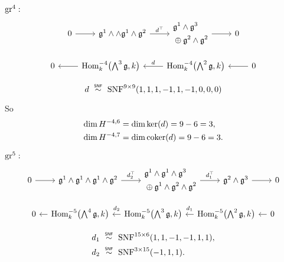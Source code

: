 $\operatorname{gr}^{4}:$
\[
  \begin{tikzcd}[ampersand replacement=\&]
    0 \ar[r] \& \lie{g}^{1} \wedge \wedge \lie{g}^{1} \wedge \lie{g}^{2} \ar[r,"d^{\top}"] \& \begin{aligned} &\lie{g}^{1} \wedge \lie{g}^{3} \\ &\oplus \lie{g}^{2} \wedge \lie{g}^{2} \end{aligned} \ar[r] \& 0
  \end{tikzcd}
\]

\[
  \begin{tikzcd}
    0 & \ar[l] \Hom_{k}^{-4}\bigl( \bigwedge^{3}\lie{g}, k \bigr) & \ar[l,"d"'] \Hom_{k}^{-4}\bigl( \bigwedge^{2}\lie{g}, k \bigr) &  \ar[l] 0
  \end{tikzcd}
\]

\begin{equation*}
  d \snfsim \SNF^{9\times9}(1,1,1,-1,1,-1,0,0,0)
\end{equation*}

So
\begin{align*}
  \dim H^{-4,6} &= \dim \operatorname{ker}(d) = 9-6 = 3, \\
  \dim H^{-4,7} &= \dim \operatorname{coker}(d) = 9-6 = 3.
\end{align*}

$\operatorname{gr}^{5}:$
\[
  \begin{tikzcd}[ampersand replacement=\&]
    0 \ar[r] \& \lie{g}^{1} \wedge \lie{g}^{1} \wedge \lie{g}^{1} \wedge \lie{g}^{2} \ar[r,"d_{2}^{\top}"] \& \begin{aligned} &\lie{g}^{1} \wedge \lie{g}^{1} \wedge \lie{g}^{3} \\ &\oplus \lie{g}^{1} \wedge \lie{g}^{2} \wedge \lie{g}^{2} \end{aligned} \ar[r,"d_{1}^{\top}"] \& \lie{g}^{2} \wedge \lie{g}^{3} \ar[r] \& 0
  \end{tikzcd}
\]

\[
  \begin{tikzcd}[column sep=1em]
    0 & \ar[l] \Hom_{k}^{-5}\bigl( \bigwedge^{4}\lie{g}, k \bigr) & \ar[l,"d_{2}"' {yshift=2pt}] \Hom_{k}^{-5}\bigl( \bigwedge^{3}\lie{g}, k \bigr) & \ar[l,"d_{1}"' {yshift=2pt}] \Hom_{k}^{-5}\bigl( \bigwedge^{2}\lie{g}, k \bigr) & \ar[l] 0
  \end{tikzcd}
\]

\begin{align*}
  d_{1} &\snfsim \SNF^{15\times6}(1,1,-1,-1,1,1), \\
  d_{2} &\snfsim \SNF^{3\times15}(-1,1,1).
\end{align*}


